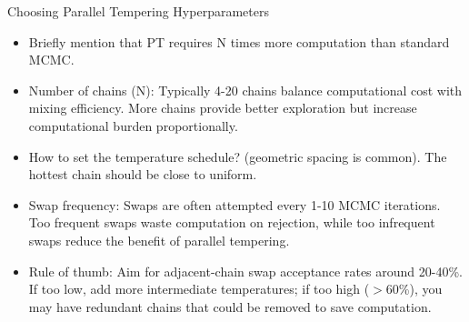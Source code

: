 \begin{frame}{Choosing Parallel Tempering Hyperparameters}
	\begin{itemize}
		\item Briefly mention that PT requires N times more computation than standard MCMC.
		\item Number of chains (N): Typically 4-20 chains balance computational cost with mixing efficiency. More chains provide better exploration but increase computational burden proportionally.
		\item How to set the temperature schedule? (geometric spacing is common). The hottest chain should be close to uniform.
		\item Swap frequency: Swaps are often attempted every 1-10 MCMC iterations. Too frequent swaps waste computation on rejection, while too infrequent swaps reduce the benefit of parallel tempering.
		\item Rule of thumb: Aim for adjacent-chain swap acceptance rates around 20-40\%. If too low, add more intermediate temperatures; if too high ($>$60\%), you may have redundant chains that could be removed to save computation.
	\end{itemize}
\end{frame}


